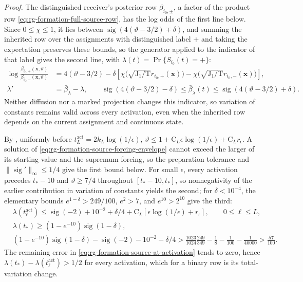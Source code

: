 \noindent\emph{Proof.}
The distinguished receiver's posterior row \(\beta_{i_0,\pm}\), a factor of
the product row \cref{eq:rg-formation-full-source-row}, has the log odds of the
first line below. Since \(0\le\chi\le1\), it lies between
\(\operatorname{sig}(4(\vartheta-3/2)\mp\delta)\), and summing the inherited
row over the assignments with distinguished label \(+\) and taking the
expectation preserves these bounds, so the generator applied to the indicator
of that label gives the second line, with \(\lambda(t)=\Pr\{S_{i_0}(t)=+\}\):
\begin{align}
 \log\frac{\beta_{i_0,+}(\mathbf x,\vartheta)}
               {\beta_{i_0,-}(\mathbf x,\vartheta)}
 &=4(\vartheta-3/2)
  -\delta\left[
 \chi\bigl(\sqrt{\mathrm J_1/\mathrm T} r_{i_0,+}(\mathbf x)\bigr)
 -\chi\bigl(\sqrt{\mathrm J_1/\mathrm T} r_{i_0,-}(\mathbf x)\bigr)\right],
 \label{eq:rg-formation-source-log-odds}\\
 \lambda'&=\bar\beta_\lambda-\lambda,
 \qquad
 \operatorname{sig}(4(\vartheta-3/2)-\delta)
 \le\bar\beta_\lambda(t)\le
 \operatorname{sig}(4(\vartheta-3/2)+\delta).
 \label{eq:rg-formation-source-forcing-envelope}
\end{align}
Neither diffusion nor a marked projection changes this indicator, so variation
of constants remains valid across every activation, even when the inherited row
depends on the current assignment and continuous state.

By , uniformly before
\(t^{\mathrm{act}}_L=2k_L\log(1/\epsilon)\),
\(\vartheta\le1+\mathrm C_L\epsilon\log(1/\epsilon)+\mathrm C_Lr_\epsilon\). A
solution of \cref{eq:rg-formation-source-forcing-envelope} cannot exceed the
larger of its starting value and the supremum forcing, so the preparation
tolerance and \(\|\operatorname{sig}'\|_\infty\le1/4\) give the first bound
below. For small \(\epsilon\),
every activation precedes \(t_*-10\) and \(\vartheta\ge7/4\) throughout
\([t_*-10,t_*]\), so nonnegativity of the earlier contribution in variation of
constants yields the second; for \(\delta<10^{-4}\), the elementary bounds
\(e^{1-\delta}>249/100\), \(e^2>7\), and \(e^{10}>2^{10}\) give the third:
\begin{align}
 &\lambda(t^{\mathrm{act}}_\ell)
 \le\operatorname{sig}(-2)+10^{-2}+\delta/4
       +\mathrm C_L[\epsilon\log(1/\epsilon)+r_\epsilon],
 \qquad 0\le \ell\le L,
 \label{eq:rg-formation-source-at-activation}\\
 &\lambda(t_*)\ge(1-e^{-10})\operatorname{sig}(1-\delta),
 \label{eq:rg-formation-source-final-mass}\\
 &(1-e^{-10})\operatorname{sig}(1-\delta)-\operatorname{sig}(-2)
       -10^{-2}-\delta/4
 >\frac{1023}{1024} \frac{249}{349}
       -\frac18-\frac1{100}-\frac1{40000}
 >\frac{57}{100}.
 \label{eq:rg-formation-source-strict-margin}
\end{align}
The remaining error in \cref{eq:rg-formation-source-at-activation} tends to
zero, hence \(\lambda(t_*)-\lambda(t^{\mathrm{act}}_\ell)>1/2\) for every
activation, which for a binary row is its total-variation change.

